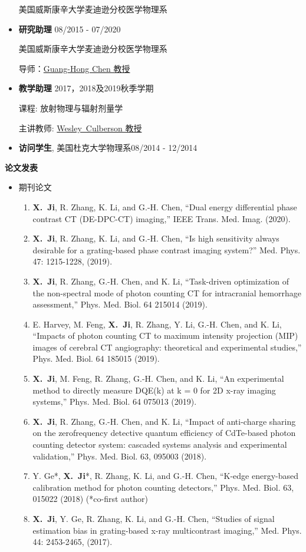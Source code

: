 \documentclass[letterpaper,11pt]{article}
\newcommand{\resheading}[1]{{\large \colorbox{mygrey}{\begin{minipage}{\textwidth}{\textbf{#1 \vphantom{p\^{E}}}}\end{minipage}}}}
\newcommand{\profchen}{\href{https://www.medphysics.wisc.edu/blog/staff/chen-guanghong/} {Guang-Hong Chen 教授}}
\newcommand{\profculberson}{\href{https://www.medphysics.wisc.edu/blog/staff/culberson-wesley/} {Wesley~Culberson 教授}}
\newcommand{\xji}{\textbf{X.~Ji}}
\begin{document}
\begin{CJK}{UTF8}{song}
\begin{itemize}
美国威斯康辛大学麦迪逊分校医学物理系
\item \textbf{研究助理}\cftdotfill{\cftdotsep} 08/2015 - 07/2020

美国威斯康辛大学麦迪逊分校医学物理系

导师：\profchen
\item \textbf{教学助理} \cftdotfill{\cftdotsep} 2017，2018及2019秋季学期

课程: 放射物理与辐射剂量学

主讲教师: \profculberson
	 \item \textbf{访问学生}, 美国杜克大学物理系\cftdotfill{\cftdotsep}08/2014 - 12/2014
\end{itemize}
\resheading{论文发表}
\begin{itemize}
\item 期刊论文
\begin{enumerate}\justifying
\item \xji, R. Zhang, K. Li, and G.-H. Chen, ``Dual energy differential phase contrast CT (DE-DPC-CT) imaging,'' IEEE Trans. Med. Imag. (2020).
\item \xji, R. Zhang, K. Li, and G.-H. Chen, ``Is high sensitivity always desirable for a grating-based phase contrast imaging system?'' Med. Phys. 47: 1215-1228, (2019).
\item \xji, R. Zhang, G.-H. Chen, and K. Li, ``Task-driven optimization of the non-spectral mode of photon counting CT for intracranial hemorrhage assessment,'' Phys. Med. Biol. 64 215014 (2019).
\item E. Harvey, M. Feng, \xji, R. Zhang, Y. Li, G.-H. Chen, and K. Li, ``Impacts of photon counting CT to maximum intensity projection (MIP) images of cerebral CT angiography: theoretical and experimental studies,'' Phys. Med. Biol. 64 185015 (2019).
\item \xji, M. Feng, R. Zhang, G.-H. Chen, and K. Li, ``An experimental method to directly measure DQE(k) at k = 0 for 2D x-ray imaging systems,'' Phys. Med. Biol. 64 075013 (2019).
\item \xji, R. Zhang, G.-H. Chen, and K. Li, ``Impact of anti-charge sharing on the zerofrequency detective quantum efficiency of CdTe-based photon counting detector system: cascaded systems analysis and experimental validation,'' Phys. Med. Biol. 63, 095003 (2018).
\item Y. Ge*, \xji*, R. Zhang, K. Li, and G.-H. Chen, ``K-edge energy-based calibration method for photon counting detectors,'' Phys. Med. Biol. 63, 015022 (2018) (*co-first author)
\item \xji, Y. Ge, R. Zhang, K. Li, and G.-H. Chen, ``Studies of signal estimation bias in grating-based x-ray multicontrast imaging,'' Med. Phys. 44: 2453-2465, (2017).
\end{enumerate}


\end{itemize}
\end{CJK}
\end{document}
